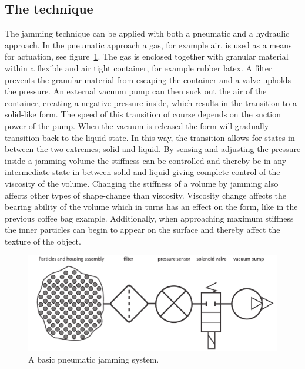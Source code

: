 

\subsection{The technique}
\label{ch:jamming:technique}

The jamming technique can be applied with both a pneumatic and a hydraulic approach.
In the pneumatic approach a gas, for example air, is used as a means for actuation, see figure~\ref{fig:ch:jamming:jamming-basics}.
The gas is enclosed together with granular material within a flexible and air tight container, for example rubber latex. 
A filter prevents the granular material from escaping the container and a valve upholds the pressure.
An external vacuum pump can then suck out the air of the container, creating a negative pressure inside, which results in the transition to a solid-like form. 
The speed of this transition of course depends on the suction power of the pump.
When the vacuum is released the form will gradually transition back to the liquid state. 
In this way, the transition allows for states in between the two extremes; solid and liquid.
By sensing and adjusting the pressure inside a jamming volume the stiffness can be controlled and thereby be in any intermediate state in between solid and liquid giving complete control of the viscosity of the volume.
Changing the stiffness of a volume by jamming also affects other types of shape-change than viscosity.
Viscosity change affects the bearing ability of the volume which in turns has an effect on the form, like in the previous coffee bag example.
Additionally, when approaching maximum stiffness the inner particles can begin to appear on the surface and thereby affect the texture of the object.
\begin{figure}[h]
  \centering
  \includegraphics[width=.9\textwidth]{figures/jamming/jamming-basics.pdf}
  \caption{A basic pneumatic jamming system.}
  \label{fig:ch:jamming:jamming-basics}
\end{figure}

